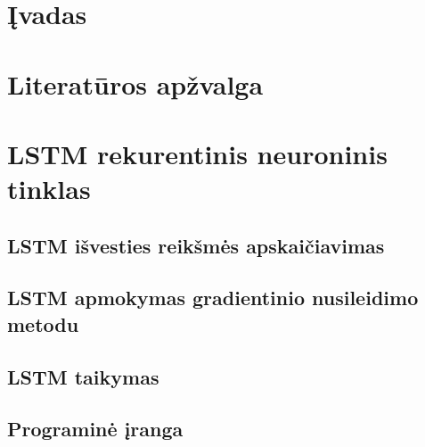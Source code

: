 \documentclass{ktu_phd_summary}
\begin{document}








\tableofcontents
\clearpage

\listoffigures
\clearpage


\section*{Įvadas}


\clearpage

\section{Literatūros apžvalga}


\clearpage



\section{LSTM rekurentinis neuroninis tinklas}




\subsection{LSTM išvesties reikšmės apskaičiavimas}


\subsection{LSTM apmokymas gradientinio nusileidimo metodu}


\subsection{LSTM taikymas}


\subsection{Programinė įranga}

\end{document}
